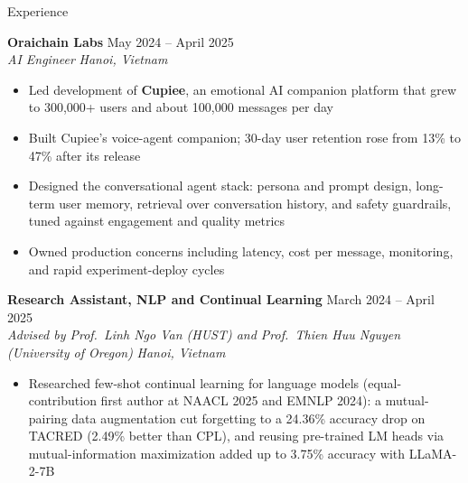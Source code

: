 \documentclass{resume} %
\begin{document}
\begin{rSection}{Experience}
\vspace{0.3em}

\textbf{Oraichain Labs} \hfill May 2024 -- April 2025\\
\textit{AI Engineer} \hfill \textit{Hanoi, Vietnam}

\begin{itemize}[leftmargin=1.5em,itemsep=0em,topsep=0.1em]
    \item Led development of \textbf{Cupiee}, an emotional AI companion platform
    that grew to 300,000+ users and about 100,000 messages per day
    \item Built Cupiee's voice-agent companion; 30-day user retention rose from
    13\% to 47\% after its release
    \item Designed the conversational agent stack: persona and prompt design,
    long-term user memory, retrieval over conversation history, and safety
    guardrails, tuned against engagement and quality metrics
    \item Owned production concerns including latency, cost per message,
    monitoring, and rapid experiment-deploy cycles
\end{itemize}

\vspace{0.3em}

\textbf{Research Assistant, NLP and Continual Learning}
\hfill March 2024 -- April 2025\\
\textit{Advised by Prof.\ Linh Ngo Van (HUST) and Prof.\ Thien Huu Nguyen
(University of Oregon)} \hfill \textit{Hanoi, Vietnam}

\begin{itemize}[leftmargin=1.5em,itemsep=0em,topsep=0.1em]
    \item Researched few-shot continual learning for language models
    (equal-contribution first author at NAACL 2025 and EMNLP 2024): a
    mutual-pairing data augmentation cut forgetting to a 24.36\% accuracy drop
    on TACRED (2.49\% better than CPL), and reusing pre-trained LM heads via
    mutual-information maximization added up to 3.75\% accuracy with LLaMA-2-7B
\end{itemize}

\end{rSection}

\end{document}
